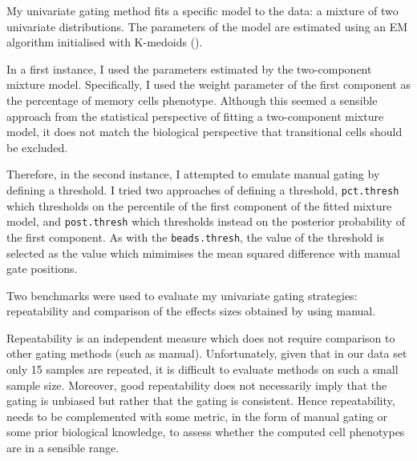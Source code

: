 My  univariate gating method fits a specific model to the data: a mixture of two univariate distributions.
The parameters of the model are estimated using an \Gls{EM} algorithm \citep{Dempster:1977ul} initialised with K-medoids ().

In a first instance, I used the parameters estimated by the two-component mixture model.
Specifically, I used the weight parameter of the first component as the percentage of memory cells phenotype.
Although this seemed a sensible approach from the statistical perspective of fitting a two-component mixture model, it does not match the biological perspective that transitional
cells should be excluded.

Therefore, in the second instance, I attempted to emulate manual gating by defining a threshold.
I tried two approaches of defining a threshold, \texttt{pct.thresh} which thresholds on the percentile of the first component of the fitted mixture model,
and \texttt{post.thresh} which thresholds instead on the posterior probability of the first component.
As with the \texttt{beads.thresh}, the value of the threshold is selected as the value which mimimises the mean squared difference with manual gate positions.

Two benchmarks were used to evaluate my univariate gating strategies: repeatability and comparison of the effects sizes obtained 
by \citet{Dendrou:2009dv} using manual.

Repeatability is an independent measure which does not require comparison to other gating methods (such as manual).
Unfortunately, given that in our data set only 15 samples are repeated, it is difficult to evaluate methods on such a small sample size.
Moreover, good repeatability does not necessarily imply that the gating is unbiased but rather that the gating is consistent.
Hence repeatability, needs to be complemented with some metric, in the form of manual gating or some prior biological knowledge,
to assess whether the computed cell phenotypes are in a sensible range.

